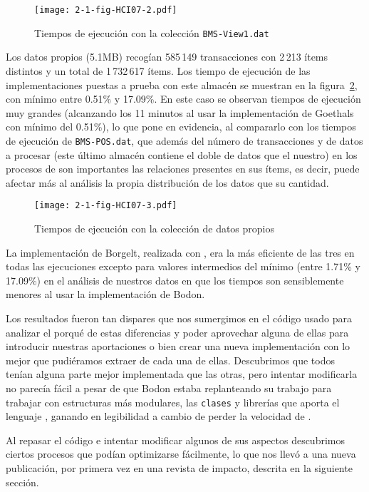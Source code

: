 \begin{figure}[htbp]
   \centering
   \texttt{[image: 2-1-fig-HCI07-2.pdf]}
   \caption{Tiempos de ejecución con la colección \texttt{BMS-View1.dat}}
\label{fig:2-1-apriori-tiemposEjecucionBMSView1}
\end{figure}

Los datos propios (5.1MB) recogían 585\,149 transacciones con 2\,213 ítems distintos y un total de 1\,732\,617 ítems. Los tiempo de ejecución de las implementaciones puestas a prueba con este almacén \D se muestran en la figura~\ref{fig:2-1-apriori-tiemposEjecucionNuestrosDatos}, con \soporte mínimo entre 0.51\% y 17.09\%. En este caso se observan tiempos de ejecución muy grandes (alcanzando los 11 minutos al usar la implementación de Goethals con \soporte mínimo del 0.51\%), lo que pone en evidencia, al compararlo con los tiempos de ejecución de \texttt{BMS-POS.dat}, que además del número de transacciones y de datos a procesar (este último almacén \D contiene el doble de datos que el nuestro) en los procesos de \arm son importantes las relaciones presentes en sus ítems, es decir, puede afectar más al análisis la propia distribución de los datos que su cantidad.

\begin{figure}[htbp]
   \centering
   \texttt{[image: 2-1-fig-HCI07-3.pdf]}
   \caption{Tiempos de ejecución con la colección de datos propios}
\label{fig:2-1-apriori-tiemposEjecucionNuestrosDatos}
\end{figure}

La implementación de Borgelt, realizada con \langC, era la más eficiente de las tres en todas las ejecuciones excepto para valores intermedios del \soporte mínimo (entre 1.71\% y 17.09\%) en el análisis de nuestros datos en que los tiempos son sensiblemente menores al usar la implementación de Bodon.

Los resultados fueron tan dispares que nos sumergimos en el código usado para analizar el porqué de estas diferencias y poder aprovechar alguna de ellas para introducir nuestras aportaciones o bien crear una nueva implementación con lo mejor que pudiéramos extraer de cada una de ellas. Descubrimos que todos tenían alguna parte mejor implementada que las otras, pero intentar modificarla no parecía fácil a pesar de que Bodon estaba replanteando su trabajo para trabajar con estructuras más modulares, las \texttt{clases} y librerías que aporta el lenguaje \langCpp, ganando en legibilidad a cambio de perder la velocidad de \langC.

Al repasar el código e intentar modificar algunos de sus aspectos descubrimos ciertos procesos que podían optimizarse fácilmente, lo que nos llevó a una nueva publicación, por primera vez en una revista de impacto, descrita en la siguiente sección.